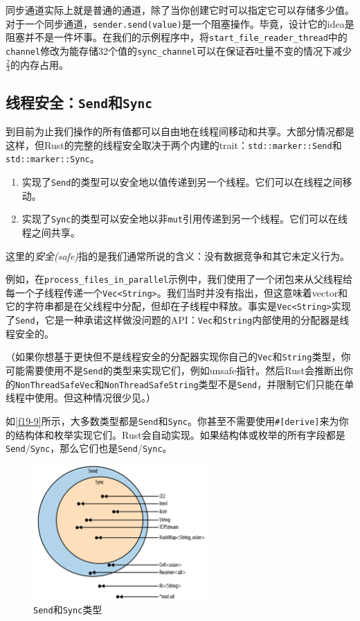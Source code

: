 同步通道实际上就是普通的通道，除了当你创建它时可以指定它可以存储多少值。对于一个同步通道，\texttt{sender.send(value)}是一个阻塞操作。毕竟，设计它的idea是阻塞并不是一件坏事。在我们的示例程序中，将\texttt{start\_file\_reader\_thread}中的\texttt{channel}修改为能存储32个值的\texttt{sync\_channel}可以在保证吞吐量不变的情况下减少$\frac{2}{3}$的内存占用。

\subsection{线程安全：\texttt{Send}和\texttt{Sync}}\label{threadsafe}
到目前为止我们操作的所有值都可以自由地在线程间移动和共享。大部分情况都是这样，但Rust的完整的线程安全取决于两个内建的trait：\texttt{std::marker::Send}和\texttt{std::marker::Sync}。

\begin{enumerate}
    \item 实现了\texttt{Send}的类型可以安全地以值传递到另一个线程。它们可以在线程之间移动。
    \item 实现了\texttt{Sync}的类型可以安全地以非\texttt{mut}引用传递到另一个线程。它们可以在线程之间共享。
\end{enumerate}

这里的\emph{安全(safe)}指的是我们通常所说的含义：没有数据竞争和其它未定义行为。

例如，在\texttt{process\_files\_in\_parallel}示例中，我们使用了一个闭包来从父线程给每一个子线程传递一个\texttt{Vec<String>}。我们当时并没有指出，但这意味着vector和它的字符串都是在父线程中分配，但却在子线程中释放。事实是\texttt{Vec<String>}实现了\texttt{Send}，它是一种承诺这样做没问题的API：\texttt{Vec}和\texttt{String}内部使用的分配器是线程安全的。

（如果你想基于更快但不是线程安全的分配器实现你自己的\texttt{Vec}和\texttt{String}类型，你可能需要使用不是\texttt{Send}的类型来实现它们，例如unsafe指针。然后Rust会推断出你的\texttt{NonThreadSafeVec}和\texttt{NonThreadSafeString}类型不是\texttt{Send}，并限制它们只能在单线程中使用。但这种情况很少见。）

如\autoref{f19-9}所示，大多数类型都是\texttt{Send}和\texttt{Sync}。你甚至不需要使用\texttt{\#[derive]}来为你的结构体和枚举实现它们。Rust会自动实现。如果结构体或枚举的所有字段都是\texttt{Send}/\texttt{Sync}，那么它们也是\texttt{Send}/\texttt{Sync}。

\begin{figure}[htbp]
    \centering
    \includegraphics[width=0.6\textwidth]{../img/f19-9.png}
    \caption{\texttt{Send}和\texttt{Sync}类型}
    \label{f19-9}
\end{figure}

